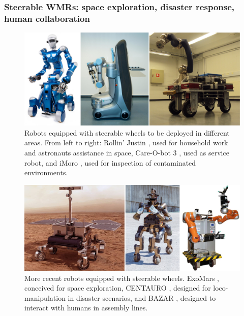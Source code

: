 \subsubsection{Steerable WMRs: space exploration, disaster response, human collaboration}
\begin{figure}
    \centering
    \includegraphics[width=\textwidth]{figures/01-introduction/SWMRs-1.jpg}
    \caption{Robots equipped with steerable wheels to be deployed in different areas.
        From left to right: Rollin' Justin \cite{Fuchs2009RollinJustin}, used 
        for household work and astronauts assistance in space, 
        Care-O-bot 3 \cite{Graf2009Care-O-bot3}, used as service robot, and
        iMoro \cite{Oftadeh2013iMoro}, used for inspection of contaminated
        environments.}
    \label{fig:introduction:SWMRs-1}
\end{figure}

\begin{figure}
    \centering
    \includegraphics[width=\textwidth]{figures/01-introduction/SWMRs-2.jpg}
    \caption{More recent robots equipped with steerable wheels.
        ExoMars \cite{Poulakis2015ExoMarsMobilitySubsystem}, conceived for 
        space exploration,
        CENTAURO \cite{Kashiri2019Centauro}, designed for loco-manipulation
        in disaster scenarios, and
        BAZAR \cite{Cherubini2019ACR}, designed to interact with humans in
        assembly lines.
    }
    \label{fig:introduction:SWMRs-2}
\end{figure}
